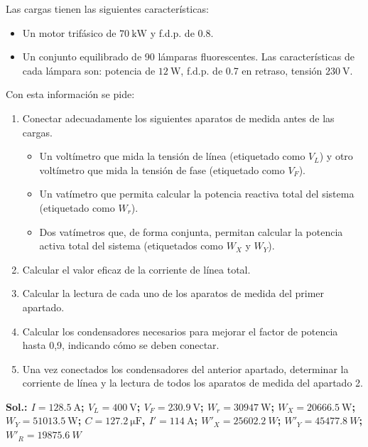 \begin{enumerate}
  Las cargas tienen las siguientes características:

  \begin{itemize}
  \item Un motor trifásico de $\SI{70}{\kilo\watt}$ y f.d.p. de 0.8.
  \item Un conjunto equilibrado de 90 lámparas fluorescentes. Las
    características de cada lámpara son: potencia de $\SI{12}{\watt}$,
    f.d.p. de 0.7 en retraso, tensión $\SI{230}{\volt}$.
  \end{itemize}

  Con esta información se pide:

  \begin{enumerate}
  \item Conectar adecuadamente los siguientes aparatos de medida antes
    de las cargas.
    \begin{itemize}
    \item Un voltímetro que mida la tensión de línea (etiquetado como
      $V_L$) y otro voltímetro que mida la tensión de fase (etiquetado
      como $V_F$).
    \item Un vatímetro que permita calcular la potencia reactiva total
      del sistema (etiquetado como $W_r$).
    \item Dos vatímetros que, de forma conjunta, permitan calcular la
      potencia activa total del sistema (etiquetados como $W_X$ y
      $W_Y$).
    \end{itemize}
  \item Calcular el valor eficaz de la corriente de línea total.
  \item Calcular la lectura de cada uno de los aparatos de medida del
    primer apartado.
  \item Calcular los condensadores necesarios para mejorar el factor
    de potencia hasta 0,9, indicando cómo se deben conectar.
  \item Una vez conectados los condensadores del anterior apartado,
    determinar la corriente de línea y la lectura de todos los
    aparatos de medida del apartado 2.
  \end{enumerate}

  \textbf{Sol.: $I = \qty{128.5}{\ampere}$; $V_L = \qty{400}{\volt}$;
    $V_F = \qty{230.9}{\volt}$; $W_r = \qty{30947}{\watt}$;
    $W_X = \qty{20666.5}{\watt}$; $W_Y = \qty{51013.5}{\watt}$;
    $C=\SI{127.2}{\micro\farad}$, $I' = \qty{114}{\ampere}$;
    $W'_X = \SI{25602.2}{W}$; $W'_Y = \SI{45477.8}{W}$;
    $W'_R = \SI{19875.6}{W}$}


\end{enumerate}
